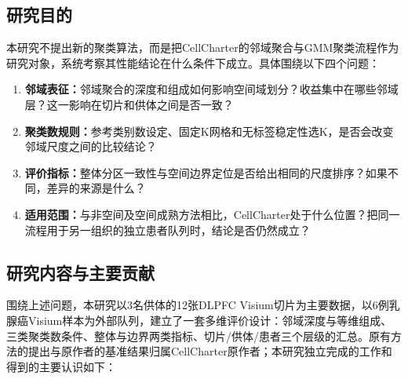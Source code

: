 \subsection{研究目的}
本研究不提出新的聚类算法，而是把CellCharter的邻域聚合与GMM聚类流程作为研究对象，系统考察其性能结论在什么条件下成立。具体围绕以下四个问题：
\begin{enumerate}
  \item \textbf{邻域表征：}邻域聚合的深度和组成如何影响空间域划分？收益集中在哪些邻域层？这一影响在切片和供体之间是否一致？
  \item \textbf{聚类数规则：}参考类别数设定、固定K网格和无标签稳定性选K，是否会改变邻域尺度之间的比较结论？
  \item \textbf{评价指标：}整体分区一致性与空间边界定位是否给出相同的尺度排序？如果不同，差异的来源是什么？
  \item \textbf{适用范围：}与非空间及空间成熟方法相比，CellCharter处于什么位置？把同一流程用于另一组织的独立患者队列时，结论是否仍然成立？
\end{enumerate}

\subsection{研究内容与主要贡献}
围绕上述问题，本研究以3名供体的12张DLPFC Visium切片为主要数据，以6例乳腺癌Visium样本为外部队列，建立了一套多维评价设计：邻域深度与等维组成、三类聚类数条件、整体与边界两类指标、切片/供体/患者三个层级的汇总。原有方法的提出与原作者的基准结果归属CellCharter原作者；本研究独立完成的工作和得到的主要认识如下：

